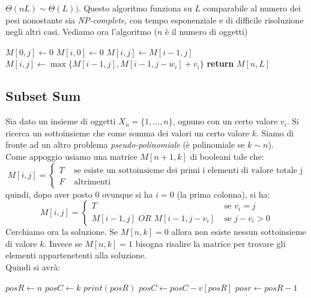 \documentclass[a4paper,12pt, oneside]{book}
\begin{document}
$\Theta(nL)\sim \Theta(L))$. Questo algoritmo funziona su $L$
comparabile al numero dei pesi nonostante sia
\textit{NP-complete}, con tempo esponenziale e di difficile
risoluzione negli altri casi. Vediamo ora l'algoritmo ($n$ è il numero
di oggetti)
\begin{algorithm}
  \begin{algorithmic}
    \State $M[0,j]\gets 0$
    \EndFor
    \State $M[i,0]\gets 0$
    \EndFor
    \State $M[i,j]\gets M[i-1,j]$
    \Else
    \State $M[i,j]\gets \max\{M[i-1,j],M[i-1,j-w_i]+v_i\}$
    \EndIf
    \EndFor
    \EndFor
    \State \textbf{return} $M[n,L]$
    \EndFunction
  \end{algorithmic}
\end{algorithm}
\subsection{Subset Sum}
Sia dato un insieme di oggetti $X_n=\{1,\ldots, n\}$, ognuno con un
certo valore $v_i$. Si ricerca un sottoinsieme che come somma dei
valori un certo valore $k$. Siamo di fronte ad un altro problema
\textit{pseudo-polinomiale} (è polinomiale se $k\sim n$).\\
Come appoggio usiamo una matrice $M[n+1,k]$ di booleani tale che:
\[M[i,j]=
  \begin{cases}
    T & \mbox{ se esiste un sottoinsieme dei primi i elementi di
      valore totale j}\\
    F & \mbox{ altrimenti}
  \end{cases}
\]
quindi, dopo aver posto $0$ ovunque si ha $i=0$ (la prima colonna), si
ha:
\[M[i,j]=
  \begin{cases}
    T & \mbox{ se } v_i=j\\
    M[i-1,j]\,\,OR\,\, M[i-1,j-v_i] & \mbox{ se } j-v_i>0
  \end{cases}
\]
Cerchiamo ora la soluzione. Se $M[n,k]=0$ allora non esiste nessun
sottoinsieme di valore $k$. Invece se $M[n,k]=1$ bisogna risalire la
matrice per trovare gli elementi appartenetenti alla soluzione.\\
Quindi si avrà:
\begin{algorithm}
  \begin{algorithmic}
    \State $posR\gets n$
    \State $posC\gets k$
    \State $print(posR)$
    \State $posC\gets posC - v[posR]$
    \EndIf
    \State $posr \gets posR-1$
    \EndWhile
  \end{algorithmic}
\end{algorithm}
\end{document}
